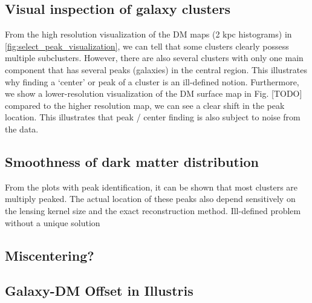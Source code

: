 \subsection{Visual inspection of galaxy clusters}
From the high resolution visualization of the DM maps (2 kpc histograms) in 
\ref{fig:select_peak_visualization}, we can tell that some clusters clearly
possess multiple subclusters. However, there are also several clusters with
only one main component that has several peaks (galaxies) in the central region. 
This illustrates why finding a `center' or peak of a cluster is an ill-defined 
notion. Furthermore, we show a lower-resolution visualization of the DM surface
map in Fig. [TODO] compared to the higher resolution map, we can see a clear
shift in the peak location. This illustrates that peak / center finding is also
subject to noise from the data.




\begin{figure*} 
	\centering
	\caption{ {\bf Left figure:} Projected density distribution of DM	
		particle data (density overlay). 
		The identified density peaks are indicated by colored circles. 
		{\bf Right figure:} Projected kernel density estimates (KDE) of member
		galaxies of the same clusters. The projections of the clusters are  
		selected at random.		
		\label{fig:select_peak_visualization}
	}
\end{figure*}


\subsection{Smoothness of dark matter distribution}
From the plots with peak identification, it can be shown that most clusters are
multiply peaked. The actual location of these peaks also depend sensitively 
on the lensing kernel size and the exact reconstruction method.  
Ill-defined problem without a unique solution 

\subsection{Miscentering?}


\subsection{Galaxy-DM Offset in Illustris}
